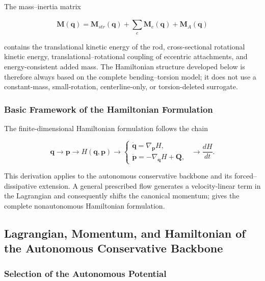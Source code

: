 The mass--inertia matrix

\begin{equation}
\label{eq:hamiltonian-3-3}
\mathbf{M}\left( \mathbf{q} \right) = \mathbf{M}_{str}\left( \mathbf{q} \right) + \sum_{e}^{}\mathbf{M}_{e}\left( \mathbf{q} \right) + \mathbf{M}_{A}\left( \mathbf{q} \right)
\end{equation}

contains the translational kinetic energy of the rod, cross-sectional rotational kinetic energy, translational--rotational coupling of eccentric attachments, and energy-consistent added mass. The Hamiltonian structure developed below is therefore always based on the complete bending--torsion model; it does not use a constant-mass, small-rotation, centerline-only, or torsion-deleted surrogate.

\subsubsection{Basic Framework of the Hamiltonian Formulation}\label{sec:hamiltonian-3-1-2}

The finite-dimensional Hamiltonian formulation follows the chain\cite{MarsdenRatiu1999MechanicsSymmetry,Arnold1989ClassicalMechanics}

\begin{equation}
\label{eq:hamiltonian-3-4}
\mathbf{q} \rightarrow \mathbf{p} \rightarrow H\left( \mathbf{q},\mathbf{p} \right) \rightarrow \left\{ \begin{matrix}
\dot{\mathbf{q}} = \nabla_{\mathbf{p}}H, \\
\dot{\mathbf{p}} = - \nabla_{\mathbf{q}}H + \mathbf{Q},
\end{matrix} \right.\ \  \rightarrow \frac{dH}{dt}.
\end{equation}

This derivation applies to the autonomous conservative backbone and its forced--dissipative extension. A general prescribed flow generates a velocity-linear term in the Lagrangian and consequently shifts the canonical momentum;  gives the complete nonautonomous Hamiltonian formulation.

\subsection{Lagrangian, Momentum, and Hamiltonian of the Autonomous Conservative Backbone}\label{sec:hamiltonian-3-2}

\subsubsection{Selection of the Autonomous Potential}\label{sec:hamiltonian-3-2-1}

